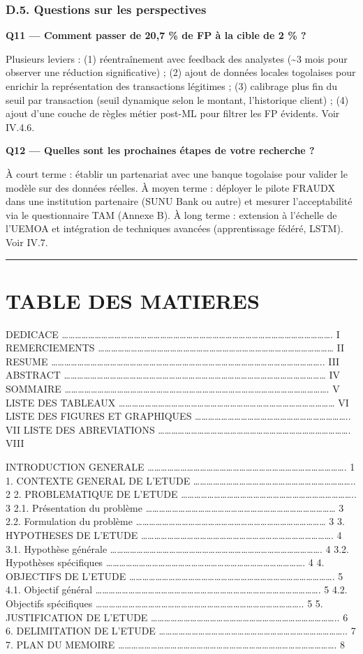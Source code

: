\documentclass[
  12pt,
]{article}
\begin{document}
\subsubsection{D.5. Questions sur les
perspectives}\label{d.5.-questions-sur-les-perspectives}

\textbf{Q11 — Comment passer de 20,7 \% de FP à la cible de 2 \% ?}

Plusieurs leviers : (1) réentraînement avec feedback des analystes
(\textasciitilde3 mois pour observer une réduction significative) ; (2)
ajout de données locales togolaises pour enrichir la représentation des
transactions légitimes ; (3) calibrage plus fin du seuil par transaction
(seuil dynamique selon le montant, l’historique client) ; (4) ajout
d’une couche de règles métier post-ML pour filtrer les FP évidents. Voir
IV.4.6.

\textbf{Q12 — Quelles sont les prochaines étapes de votre recherche ?}

À court terme : établir un partenariat avec une banque togolaise pour
valider le modèle sur des données réelles. À moyen terme : déployer le
pilote FRAUDX dans une institution partenaire (SUNU Bank ou autre) et
mesurer l’acceptabilité via le questionnaire TAM (Annexe B). À long
terme : extension à l’échelle de l’UEMOA et intégration de techniques
avancées (apprentissage fédéré, LSTM). Voir IV.7.

\begin{center}\rule{0.5\linewidth}{0.5pt}\end{center}

\section{TABLE DES MATIERES}\label{table-des-matieres}

DEDICACE ……………………………………………………………………………………………………………. I REMERCIEMENTS
……………………………………………………………………………………………… II RESUME
…………………………………………………………………………………………………………….. III ABSTRACT
………………………………………………………………………………………………………… IV SOMMAIRE
…………………………………………………………………………………………………………. V LISTE DES TABLEAUX
……………………………………………………………………………………… VI LISTE DES FIGURES ET GRAPHIQUES
…………………………………………………………….. VII LISTE DES ABREVIATIONS
……………………………………………………………………………. VIII

INTRODUCTION GENERALE ………………………………………………………………………………. 1 1. CONTEXTE
GENERAL DE L’ETUDE ……………………………………………………………….. 2 2. PROBLEMATIQUE DE
L’ETUDE …………………………………………………………………….. 3 2.1. Présentation du problème
…………………………………………………………………………… 3 2.2. Formulation du problème
…………………………………………………………………………… 3 3. HYPOTHESES DE L’ETUDE
……………………………………………………………………………. 4 3.1. Hypothèse générale
……………………………………………………………………………………. 4 3.2. Hypothèses spécifiques
………………………………………………………………………………. 4 4. OBJECTIFS DE L’ETUDE
…………………………………………………………………………………. 5 4.1. Objectif général
…………………………………………………………………………………………. 5 4.2. Objectifs spécifiques
………………………………………………………………………………….. 5 5. JUSTIFICATION DE L’ETUDE
………………………………………………………………………….. 6 6. DELIMITATION DE L’ETUDE
………………………………………………………………………….. 7 7. PLAN DU MEMOIRE
………………………………………………………………………………………. 8
\end{document}
